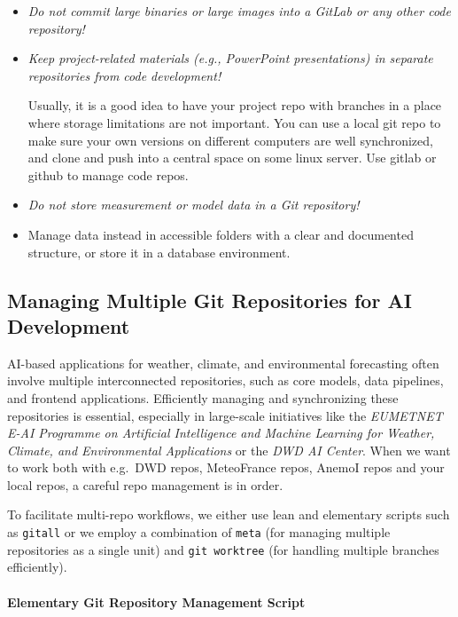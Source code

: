 \begin{itemize}
  \item \emph{Do not commit large binaries or large images into a GitLab or any other code repository!}  
  \item \emph{Keep project-related materials (e.g., PowerPoint presentations) in separate repositories from code development!} 
	
	Usually, it is a good idea to have your project repo with branches in a place where storage limitations are not important. You can use a local git repo to make sure your own versions on different computers are well synchronized, and clone and push into a central space on some linux server. Use gitlab or github to manage code repos. 
  \item \emph{Do not store measurement or model data in a Git repository!}  
  \item Manage data instead in accessible folders with a clear and documented structure, or store it in a database environment.  
\end{itemize}

\subsection{Managing Multiple Git Repositories for AI Development}

AI-based applications for weather, climate, and environmental forecasting often involve multiple interconnected repositories, such as core models, data pipelines, and frontend applications. Efficiently managing and synchronizing these repositories is essential, especially in large-scale initiatives like the \emph{EUMETNET E-AI Programme on Artificial Intelligence and Machine Learning for Weather, Climate, and Environmental Applications} or the \emph{DWD AI Center}. When we want to work both with e.g.\ DWD repos, MeteoFrance repos, AnemoI repos and your local repos, a careful repo management is in order. 

To facilitate multi-repo workflows, we either use lean and elementary scripts such as \texttt{gitall} or we employ a combination of \texttt{meta} (for managing multiple repositories as a single unit) and \texttt{git worktree} (for handling multiple branches efficiently).

%
\paragraph{Elementary Git Repository Management Script}

